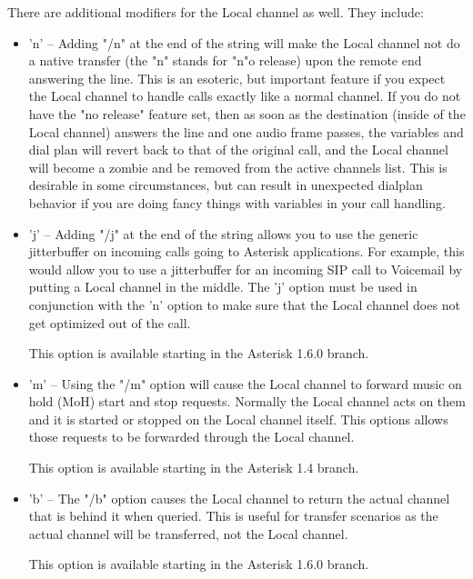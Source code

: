 There are additional modifiers for the Local channel as well. They include:

\begin{itemize}
\item 'n' -- Adding "/n" at the end of the string will make the Local channel not 
          do a native transfer (the "n" stands for "n"o release) upon the remote
          end answering the line. This is an esoteric, but important feature if
          you expect the Local channel to handle calls exactly like a normal
          channel. If you do not have the "no release" feature set, then as soon
          as the destination (inside of the Local channel) answers the line and
          one audio frame passes, the variables and dial plan will revert back
          to that of the original call, and the Local channel will become a
          zombie and be removed from the active channels list. This is desirable
          in some circumstances, but can result in unexpected dialplan behavior
          if you are doing fancy things with variables in your call handling.

\item 'j' -- Adding "/j" at the end of the string allows you to use the generic
          jitterbuffer on incoming calls going to Asterisk applications. For 
          example, this would allow you to use a jitterbuffer for an incoming
          SIP call to Voicemail by putting a Local channel in the middle. The 
          'j' option must be used in conjunction with the 'n' option to make
          sure that the Local channel does not get optimized out of the call.

          This option is available starting in the Asterisk 1.6.0 branch.

\item 'm' -- Using the "/m" option will cause the Local channel to forward music on
          hold (MoH) start and stop requests. Normally the Local channel acts on
          them and it is started or stopped on the Local channel itself. This
          options allows those requests to be forwarded through the Local
          channel.

          This option is available starting in the Asterisk 1.4 branch.

\item 'b' -- The "/b" option causes the Local channel to return the actual channel
          that is behind it when queried. This is useful for transfer scenarios
          as the actual channel will be transferred, not the Local channel.

          This option is available starting in the Asterisk 1.6.0 branch.
\end{itemize}
